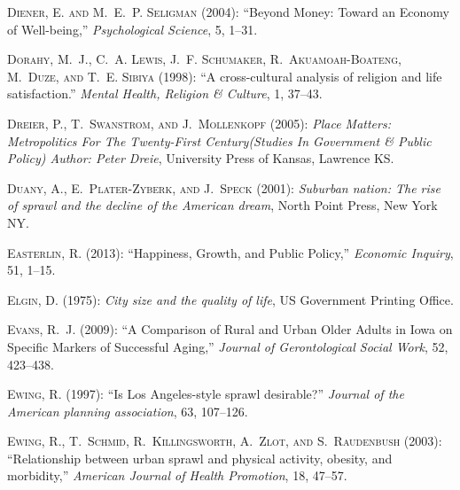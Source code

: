 \documentclass[12pt, letterpaper]{article}
\begin{document}
\begin{spacing}{1.9}
\begin{thebibliography}{77}
\textsc{Diener, E. and M.~E.~P. Seligman} (2004): \enquote{Beyond Money: Toward
  an Economy of Well-being,} \emph{Psychological Science}, 5, 1--31.

\textsc{Dorahy, M.~J., C.~A. Lewis, J.~F. Schumaker, R.~Akuamoah-Boateng,
  M.~Duze, and T.~E. Sibiya} (1998): \enquote{A cross-cultural analysis of
  religion and life satisfaction.} \emph{Mental Health, Religion \& Culture},
  1, 37--43.

\textsc{Dreier, P., T.~Swanstrom, and J.~Mollenkopf} (2005): \emph{Place
  Matters: Metropolitics For The Twenty-First Century(Studies In Government \&
  Public Policy) Author: Peter Dreie}, University Press of Kansas, Lawrence KS.

\textsc{Duany, A., E.~Plater-Zyberk, and J.~Speck} (2001): \emph{Suburban
  nation: The rise of sprawl and the decline of the American dream}, North
  Point Press, New York NY.

\textsc{Easterlin, R.} (2013): \enquote{Happiness, Growth, and Public Policy,}
  \emph{Economic Inquiry}, 51, 1--15.

\textsc{Elgin, D.} (1975): \emph{City size and the quality of life}, US
  Government Printing Office.

\textsc{Evans, R.~J.} (2009): \enquote{A Comparison of Rural and Urban Older
  Adults in Iowa on Specific Markers of Successful Aging,} \emph{Journal of
  Gerontological Social Work}, 52, 423--438.

\textsc{Ewing, R.} (1997): \enquote{Is Los Angeles-style sprawl desirable?}
  \emph{Journal of the American planning association}, 63, 107--126.

\textsc{Ewing, R., T.~Schmid, R.~Killingsworth, A.~Zlot, and S.~Raudenbush}
  (2003): \enquote{Relationship between urban sprawl and physical activity,
  obesity, and morbidity,} \emph{American Journal of Health Promotion}, 18,
  47--57.


\end{thebibliography}
\end{spacing}
\end{document}
